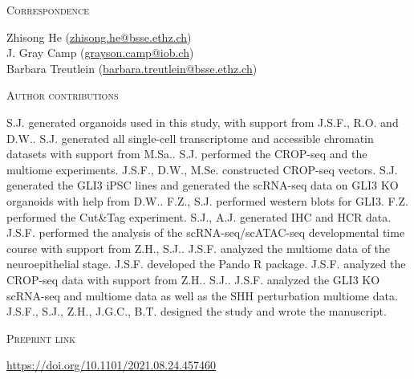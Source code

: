 \vspace{1cm}

\noindent
{\large\textsc{Correspondence}} 

\noindent
Zhisong He (\href{mailto:zhisong.he@bsse.ethz.ch}{zhisong.he@bsse.ethz.ch})\\
J. Gray Camp (\href{mailto:grayson.camp@iob.ch}{grayson.camp@iob.ch})\\
Barbara Treutlein (\href{mailto:barbara.treutlein@bsse.ethz.ch}{barbara.treutlein@bsse.ethz.ch})

\vspace{1cm}

\noindent
{\large\textsc{Author contributions}} 

\noindent
S.J. generated organoids used in this study, with support from J.S.F., R.O. and D.W.. S.J. generated all single-cell transcriptome and accessible chromatin datasets with support from M.Sa.. S.J. performed the CROP-seq and the multiome experiments. J.S.F., D.W., M.Se. constructed CROP-seq vectors. S.J. generated the GLI3 iPSC lines and generated the scRNA-seq data on GLI3 KO organoids with help from D.W.. F.Z., S.J. performed western blots for GLI3. F.Z. performed the Cut\&Tag experiment. S.J., A.J. generated IHC and HCR data. J.S.F. performed the analysis of the scRNA-seq/scATAC-seq developmental time course with support from Z.H., S.J.. J.S.F. analyzed the multiome data of the neuroepithelial stage. J.S.F. developed the Pando R package. J.S.F. analyzed the CROP-seq data with support from Z.H.. S.J.. J.S.F. analyzed the GLI3 KO scRNA-seq and multiome data as well as the SHH perturbation multiome data. J.S.F., S.J., Z.H., J.G.C., B.T. designed the study and wrote the manuscript.

\vspace{1cm}

\noindent
{\large\textsc{Preprint link}} 

\noindent
\href{https://doi.org/10.1101/2021.08.24.457460}{https://doi.org/10.1101/2021.08.24.457460}



